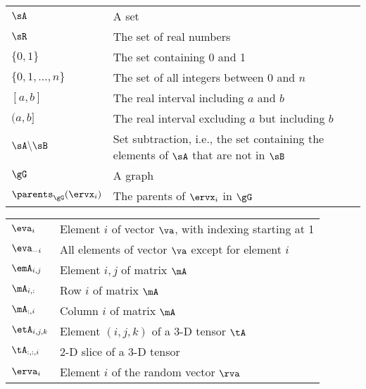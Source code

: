 \clearpage
{}
\bgroup
\def\arraystretch{1.5}
\begin{tabular}{p{1.5in}p{3.5in}}
$\displaystyle \sA$ & A set \\
$\displaystyle \sR$ & The set of real numbers \\
$\displaystyle \{0, 1\}$ & The set containing 0 and 1 \\
$\displaystyle \{0, 1, \dots, n \}$ & The set of all integers between $0$ and $n$ \\
$\displaystyle [a, b]$ & The real interval including $a$ and $b$ \\
$\displaystyle (a, b]$ & The real interval excluding $a$ but including $b$ \\
$\displaystyle \sA \backslash \sB$ & Set subtraction, i.e., the set containing the elements of $\sA$ that are not in $\sB$ \\
$\displaystyle \gG$ & A graph \\
$\displaystyle \parents_\gG(\ervx_i)$ & The parents of $\ervx_i$ in $\gG$
\end{tabular}
\vspace{0.5cm}

\clearpage
{}
\bgroup
\def\arraystretch{1.5}
\begin{tabular}{p{1.5in}p{3.5in}}
$\displaystyle \eva_i$ & Element $i$ of vector $\va$, with indexing starting at 1 \\
$\displaystyle \eva_{-i}$ & All elements of vector $\va$ except for element $i$ \\
$\displaystyle \emA_{i,j}$ & Element $i, j$ of matrix $\mA$ \\
$\displaystyle \mA_{i, :}$ & Row $i$ of matrix $\mA$ \\
$\displaystyle \mA_{:, i}$ & Column $i$ of matrix $\mA$ \\
$\displaystyle \etA_{i, j, k}$ & Element $(i, j, k)$ of a 3-D tensor $\tA$ \\
$\displaystyle \tA_{:, :, i}$ & 2-D slice of a 3-D tensor\\
$\displaystyle \erva_i$ & Element $i$ of the random vector $\rva$ \\
\end{tabular}
\egroup
\vspace{0.5cm}

